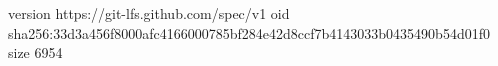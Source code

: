 version https://git-lfs.github.com/spec/v1
oid sha256:33d3a456f8000afc4166000785bf284e42d8ccf7b4143033b0435490b54d01f0
size 6954
